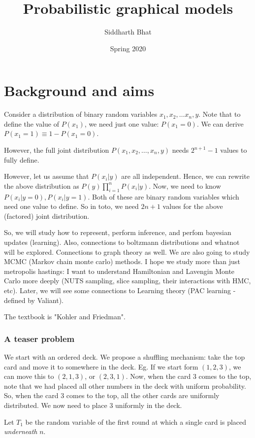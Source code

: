 \documentclass[11pt]{book}
\title{Probabilistic graphical models}
\author{Siddharth Bhat}
\date{Spring 2020}
\begin{document}
\maketitle
\tableofcontents

\chapter{Background and aims}
Consider a distribution of binary random variables $x_1, x_2, \dots x_n, y$.
Note that to define the value of $P(x_1)$, we need just one value:
$P(x_1 = 0)$. We can derive $P(x_1 = 1) \equiv 1 - P(x_1 = 0)$.

However, the full joint distribution
$P(x_1, x_2, \dots, x_n, y)$ needs $2^{n+1} - 1$ values to fully define.


However, let us assume that $P(x_i|y)$ are all independent. Hence, we can
rewrite the above distribution as $P(y) \prod_{i=1}^n P(x_i|y)$. Now, we need
to know $P(x_i|y=0), P(x_i|y=1)$. Both of these are binary random variables
which need one value to define. So in toto, we need $2n + 1$ values for
the above (factored) joint distribution.

So, we will study how to represent, perform inference, and perfom bayesian
updates (learning). Also, connections to boltzmann distributions and whatnot
will be explored. Connections to graph theory as well. We are also going to
study MCMC (Markov chain monte carlo) methods. I hope we study more than
just metropolis hastings: I want to understand Hamiltonian and Lavengin Monte
Carlo more deeply (NUTS sampling, slice sampling, their interactions with 
HMC, etc). Later, we will see some connections to Learning theory (PAC
learning - defined by Valiant).

The textbook is "Kohler and Friedman".


\subsection{A teaser problem}
We start with an ordered deck. We propose a shuffling mechanism: take the
top card and move it to somewhere in the deck. Eg. If we start form $(1, 2, 3)$,
we can move this to $(2, 1, 3)$, or $(2, 3, 1)$. Now, when the card $3$ comes
to the top, note that we had placed all other numbers in the deck with
uniform probability. So, when the card $3$ comes to the top, all the other
cards are uniformly distributed. We now need to place $3$ uniformly in the
deck.

Let $T_1$ be the random variable of the first
round at which a single card is placed \emph{underneath} $n$.
\end{document}
